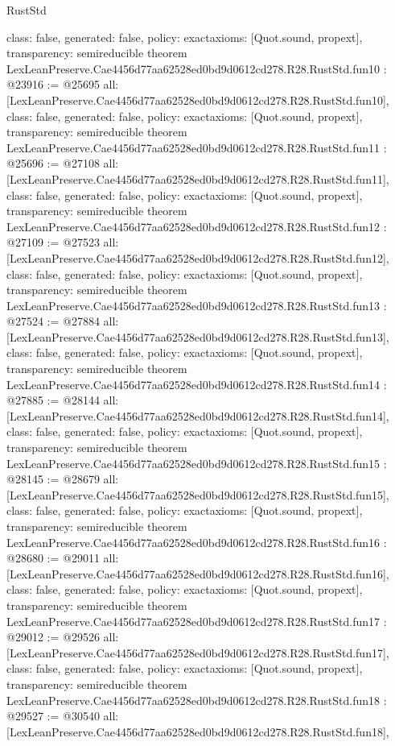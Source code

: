 \begin{lexlean}{RustStd}
\begin{coremodule}
{  class: false,
  generated: false,
  policy: exact{axioms: [Quot.sound, propext]},
  transparency: semireducible
}
theorem LexLeanPreserve.Cae4456d77aa62528ed0bd9d0612cd278.R28.RustStd.fun10 : @23916 := @25695 {
  all: [LexLeanPreserve.Cae4456d77aa62528ed0bd9d0612cd278.R28.RustStd.fun10],
  class: false,
  generated: false,
  policy: exact{axioms: [Quot.sound, propext]},
  transparency: semireducible
}
theorem LexLeanPreserve.Cae4456d77aa62528ed0bd9d0612cd278.R28.RustStd.fun11 : @25696 := @27108 {
  all: [LexLeanPreserve.Cae4456d77aa62528ed0bd9d0612cd278.R28.RustStd.fun11],
  class: false,
  generated: false,
  policy: exact{axioms: [Quot.sound, propext]},
  transparency: semireducible
}
theorem LexLeanPreserve.Cae4456d77aa62528ed0bd9d0612cd278.R28.RustStd.fun12 : @27109 := @27523 {
  all: [LexLeanPreserve.Cae4456d77aa62528ed0bd9d0612cd278.R28.RustStd.fun12],
  class: false,
  generated: false,
  policy: exact{axioms: [Quot.sound, propext]},
  transparency: semireducible
}
theorem LexLeanPreserve.Cae4456d77aa62528ed0bd9d0612cd278.R28.RustStd.fun13 : @27524 := @27884 {
  all: [LexLeanPreserve.Cae4456d77aa62528ed0bd9d0612cd278.R28.RustStd.fun13],
  class: false,
  generated: false,
  policy: exact{axioms: [Quot.sound, propext]},
  transparency: semireducible
}
theorem LexLeanPreserve.Cae4456d77aa62528ed0bd9d0612cd278.R28.RustStd.fun14 : @27885 := @28144 {
  all: [LexLeanPreserve.Cae4456d77aa62528ed0bd9d0612cd278.R28.RustStd.fun14],
  class: false,
  generated: false,
  policy: exact{axioms: [Quot.sound, propext]},
  transparency: semireducible
}
theorem LexLeanPreserve.Cae4456d77aa62528ed0bd9d0612cd278.R28.RustStd.fun15 : @28145 := @28679 {
  all: [LexLeanPreserve.Cae4456d77aa62528ed0bd9d0612cd278.R28.RustStd.fun15],
  class: false,
  generated: false,
  policy: exact{axioms: [Quot.sound, propext]},
  transparency: semireducible
}
theorem LexLeanPreserve.Cae4456d77aa62528ed0bd9d0612cd278.R28.RustStd.fun16 : @28680 := @29011 {
  all: [LexLeanPreserve.Cae4456d77aa62528ed0bd9d0612cd278.R28.RustStd.fun16],
  class: false,
  generated: false,
  policy: exact{axioms: [Quot.sound, propext]},
  transparency: semireducible
}
theorem LexLeanPreserve.Cae4456d77aa62528ed0bd9d0612cd278.R28.RustStd.fun17 : @29012 := @29526 {
  all: [LexLeanPreserve.Cae4456d77aa62528ed0bd9d0612cd278.R28.RustStd.fun17],
  class: false,
  generated: false,
  policy: exact{axioms: [Quot.sound, propext]},
  transparency: semireducible
}
theorem LexLeanPreserve.Cae4456d77aa62528ed0bd9d0612cd278.R28.RustStd.fun18 : @29527 := @30540 {
  all: [LexLeanPreserve.Cae4456d77aa62528ed0bd9d0612cd278.R28.RustStd.fun18],
}
\end{coremodule}
\end{lexlean}
